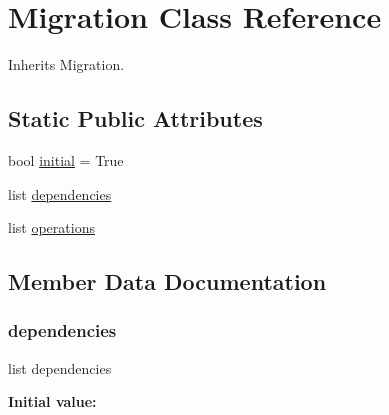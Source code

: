 \hypertarget{classjoinapp_1_1migrations_1_10001__initial_1_1_migration}{}\section{Migration Class Reference}
\label{classjoinapp_1_1migrations_1_10001__initial_1_1_migration}


Inherits Migration.

\subsection*{Static Public Attributes}
\begin{DoxyCompactItemize}
\item 
bool \mbox{\hyperlink{classjoinapp_1_1migrations_1_10001__initial_1_1_migration_aa87a85dc3f3ab85f078e036a4c9e8a66}{initial}} = True
\item 
list \mbox{\hyperlink{classjoinapp_1_1migrations_1_10001__initial_1_1_migration_a2bf1a0da0a83299e260789a8473d7460}{dependencies}}
\item 
list \mbox{\hyperlink{classjoinapp_1_1migrations_1_10001__initial_1_1_migration_a33f24b85692683d7286389f0224a3d13}{operations}}
\end{DoxyCompactItemize}


\subsection{Member Data Documentation}
\mbox{\label{classjoinapp_1_1migrations_1_10001__initial_1_1_migration_a2bf1a0da0a83299e260789a8473d7460}} 
\subsubsection{\texorpdfstring{dependencies}{dependencies}}
{\footnotesize\ttfamily list dependencies\hspace{0.3cm}{\ttfamily [static]}}

{\bfseries Initial value\+:}
\begin{DoxyCode}{0}
\DoxyCodeLine{=  [}
\DoxyCodeLine{    ]}

\end{DoxyCode}
\mbox{\label{classjoinapp_1_1migrations_1_10001__initial_1_1_migration_aa87a85dc3f3ab85f078e036a4c9e8a66}} 
